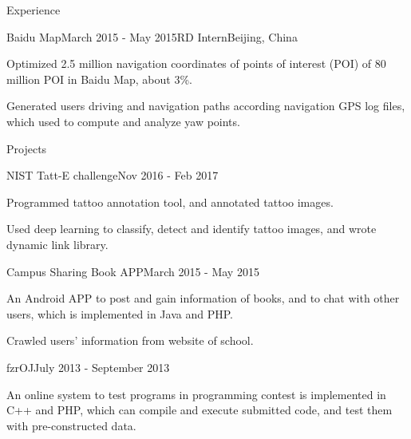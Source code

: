 \documentclass{resume} %
\begin{document}
\begin{rSection}{Experience}
\begin{rSubsection}{Baidu Map}{March 2015 - May 2015}{RD Intern}{Beijing, China}
\item Optimized 2.5 million navigation coordinates of points of interest (POI) of 80 million POI in Baidu Map, about 3\%.
\item Generated users driving and navigation paths according navigation GPS log files, which used to compute and analyze yaw points.
\end{rSubsection}
\end{rSection}






\begin{rSection}{Projects}


\begin{rSubsection}{NIST Tatt-E challenge}{Nov 2016 - Feb 2017}{}{}
\item Programmed tattoo annotation tool, and annotated tattoo images.
\item Used deep learning to classify, detect and identify tattoo images, and wrote dynamic link library. 
\end{rSubsection}

\begin{rSubsection}{Campus Sharing Book APP}{March 2015 - May 2015}{}{}
\item An Android APP to post and gain information of books, and to chat with other users, which is implemented in Java and PHP.
\item Crawled users' information from website of school.
\end{rSubsection}

\begin{rSubsection}{fzrOJ}{July 2013 - September 2013}{}{}
\item An online system to test programs in programming contest is implemented in C++ and PHP, which can compile and execute submitted code, and test them with pre-constructed data.
\end{rSubsection}

\end{rSection}
\end{document}
